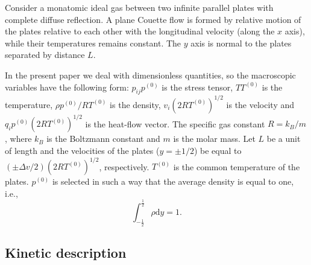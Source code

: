 \documentclass[aip,pof,preprint]{revtex4-1}
\newcommand{\dd}{\mathrm{d}}
\begin{document}
Consider a monatomic ideal gas between two infinite parallel plates with complete diffuse reflection.
A plane Couette flow is formed by relative motion of the plates relative to each other
with the longitudinal velocity (along the \(x\) axis),
while their temperatures remains constant.
The \(y\) axis is normal to the plates separated by distance \(L\).

In the present paper we deal with dimensionless quantities, so the macroscopic variables
have the following form: \(p_{ij}p^{(0)}\) is the stress tensor, \(TT^{(0)}\) is the temperature,
\(\rho p^{(0)}/RT^{(0)}\) is the density, \(v_i(2RT^{(0)})^{1/2}\) is the velocity
and \(q_ip^{(0)}(2RT^{(0)})^{1/2}\) is the heat-flow vector.
The specific gas constant \(R = k_B/m\), where \(k_B\) is the Boltzmann constant
and \(m\) is the molar mass.
Let \(L\) be a unit of length and the velocities of the plates (\(y=\pm1/2\))
be equal to \((\pm\Delta{v}/2)(2RT^{(0)})^{1/2}\), respectively.
\(T^{(0)}\) is the common temperature of the plates.
\(p^{(0)}\) is selected in such a way that the average density is equal to one, i.e.,
\begin{equation}\label{eq:total_mass}
    \int_{-\frac12}^\frac12\rho\dd{y} = 1.
\end{equation}

\subsection{Kinetic description}
\end{document}
